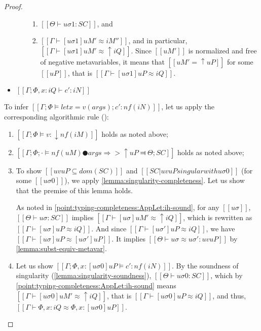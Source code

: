 \begin{proof}
\begin{caseof}
\begin{itemize}
\begin{enumerate}
\begin{enumerate}
                                \item $[[Θ ⊢ uσ1 : SC]]$, and 
                                \item $[[Γ ⊢ [uσ1]uM' ≈ iM'']]$, and 
                                in particular, $[[Γ ⊢ [uσ1]uM' ≈ ↑iQ]]$.
                                Since $[[uM']]$ is
                                normalized and free of 
                                negative metavariables, it means that 
                                $[[uM' = ↑uP]]$ for some $[[uP]]$, 
                                that is $[[Γ ⊢ [uσ1]uP ≈ iQ]]$.
                            \end{enumerate}
                    \end{enumerate}
                \item $[[Γ; Φ, x:iQ ⊢ c' : iN]]$
            \end{itemize}


            To infer $[[Γ ; Φ ⊨ let x = v(args); c' : nf(iN)]]$, 
            let us apply the corresponding algorithmic rule 
            ():
            \begin{enumerate}
                \item $[[Γ ; Φ ⊨ v : ↓nf(iM)]]$ holds as noted above;

                \item $[[Γ; Φ ; · ⊨ nf(uM) ● args ⇒> ↑uP ⫤ Θ; SC]]$ holds as noted above;

                \item To show $[[uv uP ⊆ dom(SC)]]$ and 
                    $[[SC | uv uP singular with uσ0]]$ (for some $[[uσ0]]$),
                    we apply \cref{lemma:singularity-completeness}.
                    Let us show that the premise of this lemma holds.

                    As noted in \ref{point:typing-completeness:AppLet:ih-sound},
                    for any $[[uσ]]$, $[[Θ ⊢ uσ : SC]]$ implies 
                    $[[Γ ⊢ [uσ]uM' ≈ ↑iQ]]$,
                    which is rewritten as $[[Γ ⊢ [uσ]uP ≈ iQ]]$.
                    And since $[[Γ ⊢ [uσ']uP ≈ iQ]]$, 
                    we have $[[Γ ⊢ [uσ]uP ≈ [uσ']uP]]$.
                    It implies $[[Θ ⊢ uσ ≈ uσ' : uv uP]]$
                    by \cref{lemma:subst-equiv-metavar}.

                \item Let us show $[[Γ; Φ, x:[uσ0]uP ⊨ c' : nf(iN)]]$.
                    By the soundness of singularity 
                    (\cref{lemma:singularity-soundness}),
                    $[[Θ ⊢ uσ0 : SC]]$,
                    which by \ref{point:typing-completeness:AppLet:ih-sound}
                    means $[[Γ ⊢ [uσ0]uM' ≈ ↑iQ]]$,
                    that is $[[Γ ⊢ [uσ0]uP ≈ iQ]]$, 
                    and thus, $[[Γ ⊢ Φ, x:iQ ≈ Φ, x:[uσ0]uP]]$.


\end{enumerate}
\end{caseof}
\end{proof}

